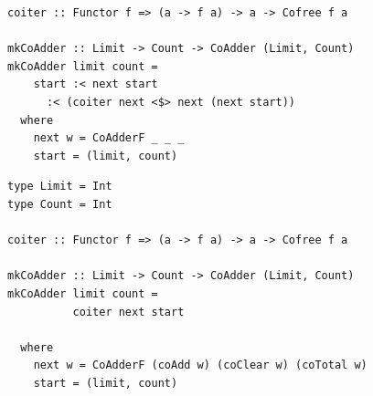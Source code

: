 \documentclass{beamer}
\begin{document}
\begin{frame}[fragile]
\begin{overprint}
\begin{verbatim}
coiter :: Functor f => (a -> f a) -> a -> Cofree f a

mkCoAdder :: Limit -> Count -> CoAdder (Limit, Count)
mkCoAdder limit count =
    start :< next start
      :< (coiter next <$> next (next start))
  where
    next w = CoAdderF _ _ _
    start = (limit, count)
  \end{verbatim}
  \begin{verbatim}
type Limit = Int
type Count = Int

coiter :: Functor f => (a -> f a) -> a -> Cofree f a

mkCoAdder :: Limit -> Count -> CoAdder (Limit, Count)
mkCoAdder limit count =
          coiter next start

  where
    next w = CoAdderF (coAdd w) (coClear w) (coTotal w)
    start = (limit, count)
  \end{verbatim}
  \end{overprint}
\end{frame}
\end{document}
